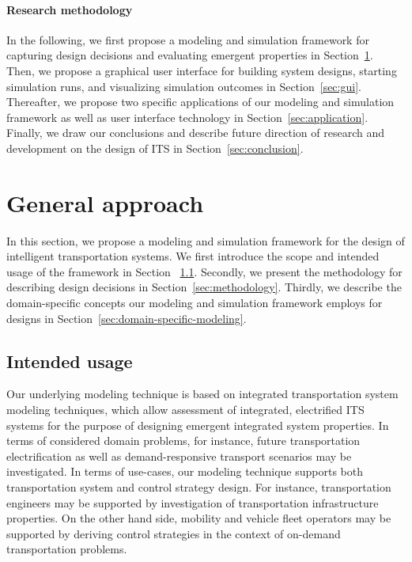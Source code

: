 \documentclass[10pt,twocolumn]{article}
\begin{document}
\paragraph{Research methodology}

In the following, we first propose a modeling and simulation framework for capturing design decisions and evaluating emergent properties in Section~\ref{sec:approach}.
Then, we propose a graphical user interface for building system designs, starting simulation runs, and visualizing simulation outcomes in Section~\ref{sec:gui}.
Thereafter, we propose two specific applications of our modeling and simulation framework as well as user interface technology in Section~\ref{sec:application}.
Finally, we draw our conclusions and describe future direction of research and development on the design of ITS in Section~\ref{sec:conclusion}. 

\section{General approach}
\label{sec:approach}

In this section, we propose a modeling and simulation framework for the design of intelligent transportation systems.
We first introduce the scope and intended usage of the framework in Section ~\ref{sec:scope}.
Secondly, we present the methodology for describing design decisions in Section~\ref{sec:methodology}.
Thirdly, we describe the domain-specific concepts our modeling and simulation framework employs for designs in Section~\ref{sec:domain-specific-modeling}.

\subsection{Intended usage}
\label{sec:scope}

Our underlying modeling technique is based on integrated transportation system modeling techniques, which allow assessment of integrated, electrified ITS systems for the purpose of designing emergent integrated system properties.
In terms of considered domain problems, for instance, future transportation electrification as well as demand-responsive transport scenarios may be investigated.
In terms of use-cases, our modeling technique supports both transportation system and control strategy design.
For instance, transportation engineers may be supported by investigation of transportation infrastructure properties.
On the other hand side, mobility and vehicle fleet operators may be supported by deriving control strategies in the context of on-demand transportation problems.
\end{document}
